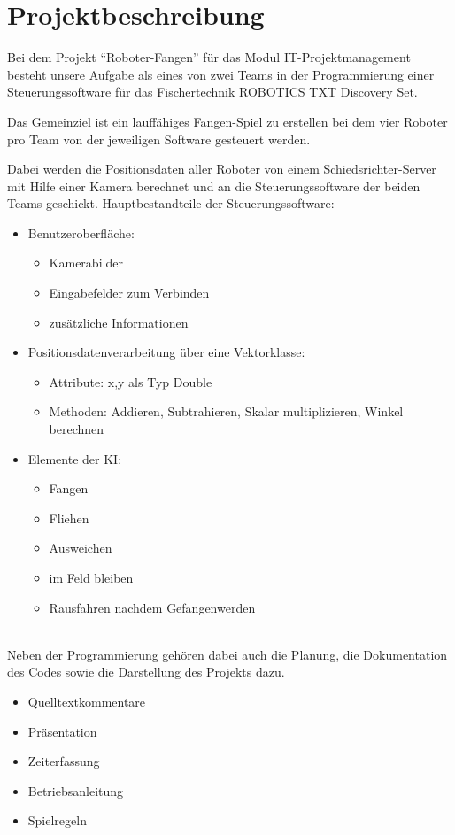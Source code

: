 \section{Projektbeschreibung}

Bei dem Projekt "`Roboter-Fangen"' für das Modul IT-Projektmanagement besteht unsere Aufgabe als eines von zwei Teams in der Programmierung einer Steuerungssoftware für das Fischertechnik ROBOTICS TXT Discovery Set.

Das Gemeinziel ist ein lauffähiges Fangen-Spiel zu erstellen bei dem vier Roboter pro Team von der jeweiligen Software gesteuert werden.

Dabei werden die Positionsdaten aller Roboter von einem Schiedsrichter-Server mit Hilfe einer Kamera berechnet und an die Steuerungssoftware der beiden Teams geschickt.
Hauptbestandteile der Steuerungssoftware:
\begin{itemize}
	\item Benutzeroberfläche:
	\begin{itemize}
		\item Kamerabilder
		\item Eingabefelder zum Verbinden
		\item zusätzliche Informationen
	\end{itemize}
	\item Positionsdatenverarbeitung über eine Vektorklasse:
	\begin{itemize}
		\item Attribute: x,y als Typ Double
		\item Methoden: Addieren, Subtrahieren, Skalar multiplizieren, Winkel berechnen
	\end{itemize}
	\item Elemente der KI:
	\begin{itemize}
		\item Fangen
		\item Fliehen
		\item Ausweichen
		\item im Feld bleiben
		\item Rausfahren nachdem Gefangenwerden
	\end{itemize}
\end{itemize}
\\
Neben der Programmierung gehören dabei auch die Planung, die Dokumentation des Codes sowie die Darstellung des Projekts dazu.
\begin{itemize}
	\item Quelltextkommentare
	\item Präsentation
	\item Zeiterfassung
	\item Betriebsanleitung
	\item Spielregeln
\end{itemize}